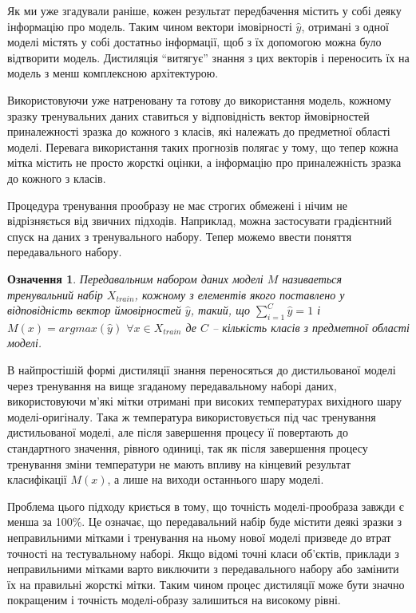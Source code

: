 \documentclass[14pt,a4paper]{extarticle}
\newcounter{e}
\newtheorem{defn}[theorem]{Означення}
\numberwithin{equation}{section}
\numberwithin{figure}{section}
\begin{document}
 Як ми уже згадували раніше, кожен результат передбачення містить у собі деяку інформацію про модель. Таким чином вектори імовірності $\hat{y}$, отримані з одної моделі містять у собі достатньо інформації, щоб з їх допомогою можна було відтворити модель. Дистиляція ``витягує'' знання з цих векторів і переносить їх на модель з менш комплексною архітектурою.
 
 Використовуючи уже натреновану та готову до використання модель, кожному зразку тренувальних даних ставиться у відповідність вектор ймовірностей приналежності зразка до кожного з класів, які належать до предметної області моделі. Перевага використання таких прогнозів полягає у тому, що тепер кожна мітка містить не просто жорсткі оцінки, а інформацію про приналежність зразка до кожного з класів.
 
 
 Процедура тренування прообразу не має строгих обмежені і нічим не відрізняється від звичних підходів. Наприклад, можна застосувати градієнтний спуск на даних з тренувального набору. Тепер можемо ввести поняття передавального набору.
 
 \begin{defn}
 	Передавальним набором даних моделі $M$ називаеться тренувальний набір $X_{train}$, кожному з елементів якого поставлено у відповідність вектор ймовірностей $\hat{y}$, такий, що $\sum\limits^C_{i=1}\hat{y} = 1$ і $M(x)=argmax(\hat{y})$ $ \forall x \in X_{train}$ де $C$ -- кількість класів з предметної області моделі.
 \end{defn}
 
 
 В найпростішій формі дистиляції знання переносяться до дистильованої моделі через тренування на вище згаданому передавальному наборі даних, використовуючи м'які мітки отримані при високих температурах вихідного шару моделі-оригіналу. Така ж температура використовується під час тренування дистильованої моделі, але після завершення процесу її повертають до стандартного значення, рівного одиниці, так як після завершення процесу тренування зміни температури не мають впливу на кінцевий результат класифікації $M(x)$, а лише на виходи останнього шару моделі.
 
 Проблема цього підходу криється в тому, що точність моделі-прообраза завжди є менша за 100\%. Це означає, що передавальний набір буде містити деякі зразки з неправильними мітками і тренування на ньому нової моделі призведе до втрат точності на тестувальному наборі. Якщо відомі точні класи об'єктів, приклади з неправильними мітками варто виключити з передавального набору або замінити їх на правильні жорсткі мітки. Таким чином процес дистиляції може бути значно покращеним і точність моделі-образу залишиться на високому рівні.
 
\end{document}
